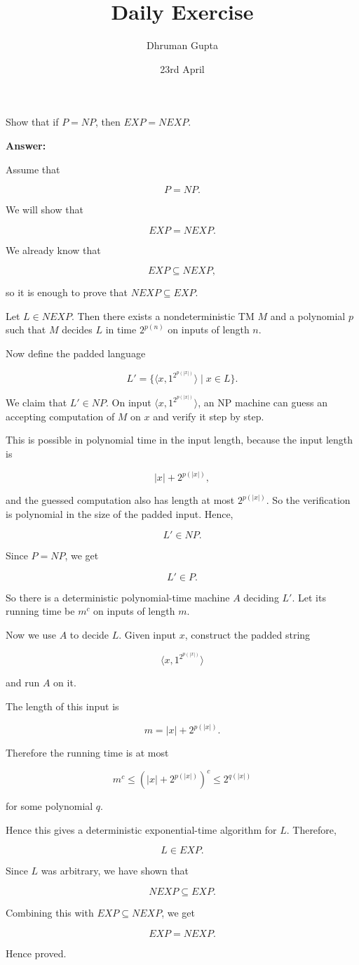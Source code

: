 \documentclass[11pt]{article}
\title{Daily Exercise}
\author{Dhruman Gupta}
\date{23rd April}
\begin{document}

Show that if $P = NP$, then $EXP = NEXP$.

\textbf{Answer:}

Assume that

\[
P = NP.
\]

We will show that

\[
EXP = NEXP.
\]

We already know that

\[
EXP \subseteq NEXP,
\]

so it is enough to prove that $NEXP \subseteq EXP$.

Let $L \in NEXP$. Then there exists a nondeterministic TM $M$ and a polynomial $p$ such that $M$ decides $L$ in time $2^{p(n)}$ on inputs of length $n$.

Now define the padded language

\[
L' = \{\langle x, 1^{2^{p(|x|)}} \rangle \mid x \in L\}.
\]

We claim that $L' \in NP$. On input $\langle x, 1^{2^{p(|x|)}} \rangle$, an NP machine can guess an accepting computation of $M$ on $x$ and verify it step by step.

This is possible in polynomial time in the input length, because the input length is

\[
|x| + 2^{p(|x|)},
\]

and the guessed computation also has length at most $2^{p(|x|)}$. So the verification is polynomial in the size of the padded input. Hence,

\[
L' \in NP.
\]

Since $P = NP$, we get

\[
L' \in P.
\]

So there is a deterministic polynomial-time machine $A$ deciding $L'$. Let its running time be $m^c$ on inputs of length $m$.

Now we use $A$ to decide $L$. Given input $x$, construct the padded string

\[
\langle x, 1^{2^{p(|x|)}} \rangle
\]

and run $A$ on it.

The length of this input is

\[
m = |x| + 2^{p(|x|)}.
\]

Therefore the running time is at most

\[
m^c \leq (|x| + 2^{p(|x|)})^c \leq 2^{q(|x|)}
\]

for some polynomial $q$.

Hence this gives a deterministic exponential-time algorithm for $L$. Therefore,

\[
L \in EXP.
\]

Since $L$ was arbitrary, we have shown that

\[
NEXP \subseteq EXP.
\]

Combining this with $EXP \subseteq NEXP$, we get

\[
EXP = NEXP.
\]

Hence proved.
\end{document}
